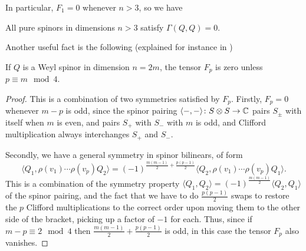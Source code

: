 \documentclass[10pt, oneside]{article}
\begin{document}
In particular, $F_1 = 0$ whenever $n > 3$, so we have
\begin{corollary}
All pure spinors in dimensions $n > 3$ satisfy $\Gamma(Q,Q) = 0$.
\end{corollary}

Another useful fact is the following (explained for instance in \cite{BudinichTrautman})
\begin{lemma} \label{WeylCriterion}
If $Q$ is a Weyl spinor in dimension $n=2m$, the tensor $F_p$ is zero unless $p \equiv m \mod 4$.
\end{lemma}

\begin{proof}
This is a combination of two symmetries satisfied by $F_p$.  Firstly, $F_p = 0$ whenever $m-p$ is odd, since the spinor pairing $\langle -,- \rangle \colon S \otimes S \to \mathbb{C}$ pairs $S_\pm$ with itself when $m$ is even, and pairs $S_+$ with $S_-$ with $m$ is odd, and Clifford multiplication always interchanges $S_+$ and $S_-$.

Secondly, we have a general symmetry in spinor bilinears, of form
\[\langle Q_1, \rho(v_1) \cdots \rho(v_p) Q_2 \rangle = (-1)^{\frac{m(m-1)}2 + \frac{p(p-1)}2}\langle Q_2, \rho(v_1) \cdots \rho(v_p) Q_1 \rangle.\]
This is a combination of the symmetry property $\langle Q_1, Q_2 \rangle = (-1)^{\frac{m(m-1)}2} \langle Q_2, Q_1 \rangle$ of the spinor pairing, and the fact that we have to do $\frac {p(p-1)}2$ swaps to restore the $p$ Clifford multiplications to the correct order upon moving them to the other side of the bracket, picking up a factor of $-1$ for each.  Thus, since if $m-p \equiv 2 \mod 4$ then $\frac{m(m-1)}2 + \frac{p(p-1)}2$ is odd, in this case the tensor $F_p$ also vanishes.
\end{proof}
\end{document}
